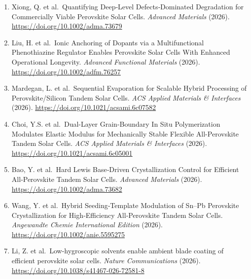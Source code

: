 \documentclass[
  11pt,
]{article}
\begin{document}
\begin{enumerate}
  Monolayers Anchoring on NiO x Enables Efficient and Stable Perovskite
  Solar Cells. \emph{Advanced Materials} (2026).
  \url{https://doi.org/10.1002/adma.73656}
\item
  Xiong, Q. et al.~Quantifying Deep‐Level Defects‐Dominated Degradation
  for Commercially Viable Perovskite Solar Cells. \emph{Advanced
  Materials} (2026). \url{https://doi.org/10.1002/adma.73679}
\item
  Liu, H. et al.~Ionic Anchoring of Dopants via a Multifunctional
  Phenothiazine Regulator Enables Perovskite Solar Cells With Enhanced
  Operational Longevity. \emph{Advanced Functional Materials} (2026).
  \url{https://doi.org/10.1002/adfm.76257}
\item
  Mardegan, L. et al.~Sequential Evaporation for Scalable Hybrid
  Processing of Perovskite/Silicon Tandem Solar Cells. \emph{ACS Applied
  Materials \& Interfaces} (2026).
  \url{https://doi.org/10.1021/acsami.6c07582}
\item
  Choi, Y.S. et al.~Dual-Layer Grain-Boundary In Situ Polymerization
  Modulates Elastic Modulus for Mechanically Stable Flexible
  All-Perovskite Tandem Solar Cells. \emph{ACS Applied Materials \&
  Interfaces} (2026). \url{https://doi.org/10.1021/acsami.6c05001}
\item
  Bao, Y. et al.~Hard Lewis Base‐Driven Crystallization Control for
  Efficient All‐Perovskite Tandem Solar Cells. \emph{Advanced Materials}
  (2026). \url{https://doi.org/10.1002/adma.73682}
\item
  Wang, Y. et al.~Hybrid Seeding‐Template Modulation of Sn--Pb
  Perovskite Crystallization for High‐Efficiency All‐Perovskite Tandem
  Solar Cells. \emph{Angewandte Chemie International Edition} (2026).
  \url{https://doi.org/10.1002/anie.5595275}
\item
  Li, Z. et al.~Low-hygroscopic solvents enable ambient blade coating of
  efficient perovskite solar cells. \emph{Nature Communications} (2026).
  \url{https://doi.org/10.1038/s41467-026-72581-8}
\end{enumerate}
\end{document}
